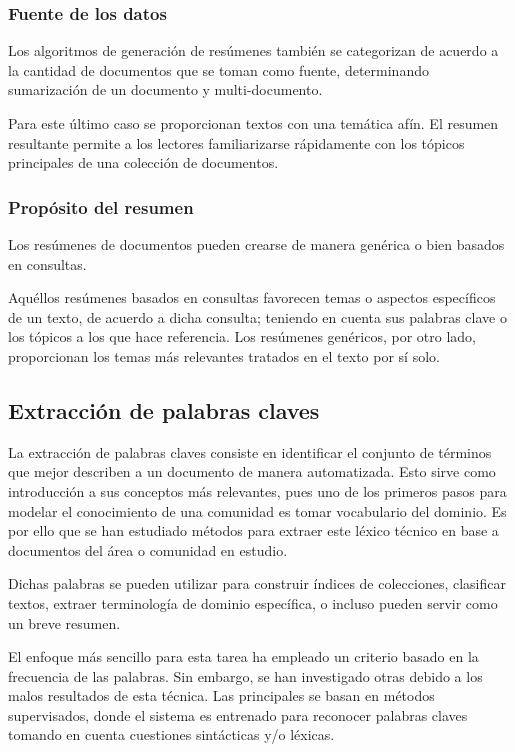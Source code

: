 \documentclass[a4paper]{article}
\begin{document}
\subsubsection{Fuente de los datos}
Los algoritmos de generación de resúmenes también se categorizan de acuerdo a la cantidad de documentos que se toman como fuente, determinando sumarización de un documento y multi-documento.

Para este último caso se proporcionan textos con una temática afín. El resumen resultante permite a los lectores familiarizarse rápidamente con los tópicos principales de una colección de documentos.


\subsubsection{Propósito del resumen}
Los resúmenes de documentos pueden crearse de manera genérica o bien basados en consultas. 

Aquéllos resúmenes basados en consultas favorecen temas o aspectos específicos de un texto, de acuerdo a dicha consulta; teniendo en cuenta sus palabras clave o los tópicos a los que hace referencia. Los resúmenes genéricos, por otro lado, proporcionan los temas más relevantes tratados en el texto por sí solo.


\subsection{Extracción de palabras claves}
La extracción de palabras claves consiste en identificar el conjunto de términos que mejor describen a un documento de manera automatizada. Esto sirve como introducción a sus conceptos más relevantes, pues uno de los primeros pasos para modelar el conocimiento de una comunidad es tomar vocabulario del dominio. Es por ello que se han estudiado métodos para extraer este léxico técnico en base a documentos del área o comunidad en estudio.

Dichas palabras se pueden utilizar para construir índices de colecciones, clasificar textos, extraer terminología de dominio específica, o incluso pueden servir como un breve resumen.

El enfoque más sencillo para esta tarea ha empleado un criterio basado en la frecuencia de las palabras. Sin embargo, se han investigado otras debido a los malos resultados de esta técnica. Las principales se basan en métodos supervisados, donde el sistema es entrenado para reconocer palabras claves tomando en cuenta cuestiones sintácticas y/o léxicas. 
\end{document}
